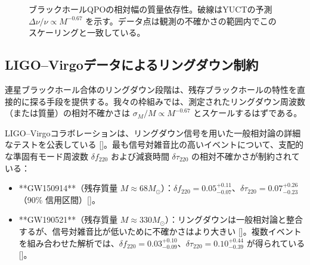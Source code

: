 \documentclass[12pt,a4paper]{article}
\begin{document}
	\begin{figure}[htbp]
		\centering
		\caption{ブラックホールQPOの相対幅の質量依存性。破線はYUCTの予測 \(\Delta\nu/\nu \propto M^{-0.67}\) を示す。データ点は観測の不確かさの範囲内でこのスケーリングと一致している。}
		\label{fig:qpo_scaling}
	\end{figure}
	
	\subsection{LIGO–Virgoデータによるリングダウン制約}
	
	連星ブラックホール合体のリングダウン段階は、残存ブラックホールの特性を直接的に探る手段を提供する。我々の枠組みでは、測定されたリングダウン周波数（または質量）の相対不確かさは \(\sigma_M/M \propto M^{-0.67}\) とスケールするはずである。
	
	LIGO–Virgoコラボレーションは、リングダウン信号を用いた一般相対論の詳細なテストを公表している [\cite{LIGO2021, Ghosh2021}]。最も信号対雑音比の高いイベントについて、支配的な準固有モード周波数 \(\delta f_{220}\) および減衰時間 \(\delta \tau_{220}\) の相対不確かさが制約されている：
	
	\begin{itemize}
		\item **GW150914**（残存質量 \(M \approx 68 M_\odot\)）：\(\delta f_{220} = 0.05^{+0.11}_{-0.07}\)、\(\delta \tau_{220} = 0.07^{+0.26}_{-0.23}\)（90\% 信用区間）[\cite{Ghosh2021}]。
		\item **GW190521**（残存質量 \(M \approx 330 M_\odot\)）：リングダウンは一般相対論と整合するが、信号対雑音比が低いために不確かさはより大きい [\cite{Abbott2020b}]。複数イベントを組み合わせた解析では、\(\delta f_{220} = 0.03^{+0.10}_{-0.09}\)、\(\delta \tau_{220} = 0.10^{+0.44}_{-0.39}\) が得られている [\cite{Ghosh2021}]。
	\end{itemize}
	
\end{document}
